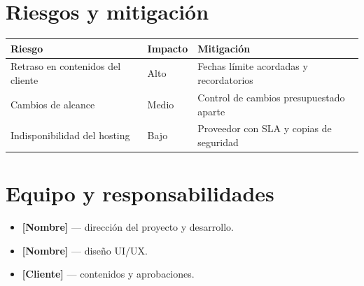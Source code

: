 \documentclass[11pt,a4paper]{article}
\begin{document}
\section{Riesgos y mitigación}
\begin{longtable}{p{5.6cm} p{2.2cm} p{6.6cm}}
  \toprule
  \textbf{Riesgo} & \textbf{Impacto} & \textbf{Mitigación}\\
  \midrule
  Retraso en contenidos del cliente & Alto  & Fechas límite acordadas y recordatorios\\
  Cambios de alcance                & Medio & Control de cambios presupuestado aparte\\
  Indisponibilidad del hosting      & Bajo  & Proveedor con SLA y copias de seguridad\\
  \bottomrule
\end{longtable}

\section{Equipo y responsabilidades}
\begin{itemize}
  \item \textbf{[Nombre]} — dirección del proyecto y desarrollo.
  \item \textbf{[Nombre]} — diseño UI/UX.
  \item \textbf{[Cliente]} — contenidos y aprobaciones.
\end{itemize}
\end{document}
